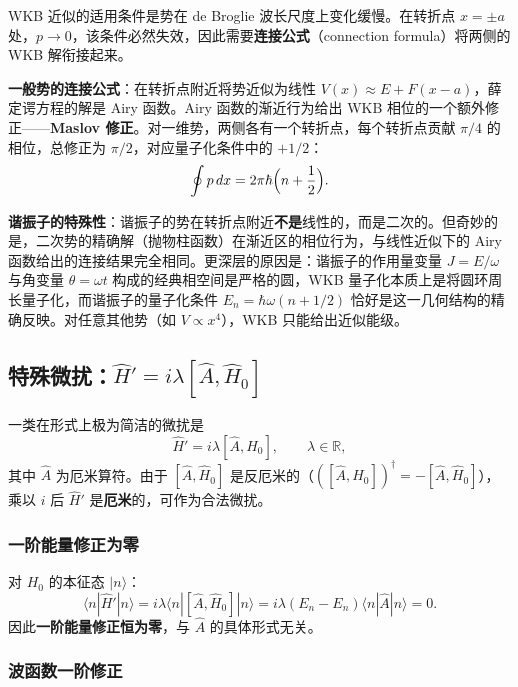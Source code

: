 \begin{insightbox}
WKB 近似的适用条件是势在 de Broglie 波长尺度上变化缓慢。在转折点 $x=\pm a$ 处，$p\to 0$，该条件必然失效，因此需要\textbf{连接公式}（connection formula）将两侧的 WKB 解衔接起来。

\textbf{一般势的连接公式}：在转折点附近将势近似为线性 $V(x)\approx E + F(x-a)$，薛定谔方程的解是 Airy 函数。Airy 函数的渐近行为给出 WKB 相位的一个额外修正——\textbf{Maslov 修正}。对一维势，两侧各有一个转折点，每个转折点贡献 $\pi/4$ 的相位，总修正为 $\pi/2$，对应量子化条件中的 $+1/2$：
\[
\oint p\,dx = 2\pi\hbar\Bigl(n + \frac12\Bigr).
\]

\textbf{谐振子的特殊性}：谐振子的势在转折点附近\textbf{不是}线性的，而是二次的。但奇妙的是，二次势的精确解（抛物柱函数）在渐近区的相位行为，与线性近似下的 Airy 函数给出的连接结果完全相同。更深层的原因是：谐振子的作用量变量 $J = E/\omega$ 与角变量 $\theta = \omega t$ 构成的经典相空间是严格的圆，WKB 量子化本质上是将圆环周长量子化，而谐振子的量子化条件 $E_n=\hbar\omega(n+1/2)$ 恰好是这一几何结构的精确反映。对任意其他势（如 $V\propto x^4$），WKB 只能给出近似能级。
\end{insightbox}

\subsection{特殊微扰：$\hat{H}' = i\lambda[\hat{A}, \hat{H}_0]$}

一类在形式上极为简洁的微扰是
\[
\hat{H}' = i\lambda[\hat{A}, \hat{H}_0],
\qquad \lambda\in\mathbb{R},
\]
其中 $\hat{A}$ 为厄米算符。由于 $[\hat{A}, \hat{H}_0]$ 是反厄米的（$([\hat{A}, \hat{H}_0])^\dagger = -[\hat{A}, \hat{H}_0]$），乘以 $i$ 后 $\hat{H}'$ 是\textbf{厄米}的，可作为合法微扰。

\subsubsection{一阶能量修正为零}

对 $H_0$ 的本征态 $|n\rangle$：
\[
\langle n|\hat{H}'|n\rangle = i\lambda\langle n|[\hat{A}, \hat{H}_0]|n\rangle
= i\lambda(E_n - E_n)\langle n|\hat{A}|n\rangle = 0.
\]
因此\textbf{一阶能量修正恒为零}，与 $\hat{A}$ 的具体形式无关。

\subsubsection{波函数一阶修正}

